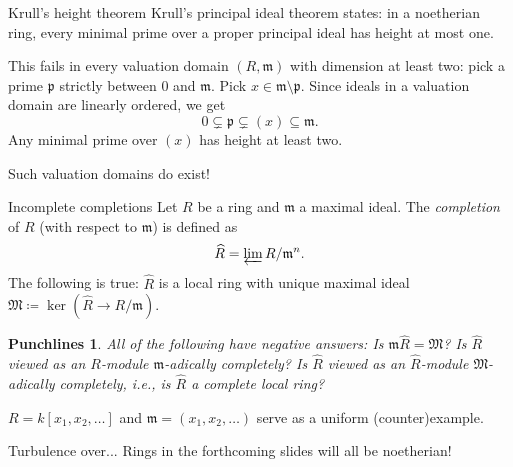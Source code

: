 \documentclass{beamer}
\newtheorem{punchlines}[theorem]{Punchlines}
\newcommand{\limit}{\varprojlim}
\begin{document}
	\begin{frame}{Krull's height theorem}
		Krull's principal ideal theorem states: in a noetherian ring, every minimal prime over a proper {\color{Red}principal} ideal \pause has height at most {\color{Red}one}. \pause

		This fails in every valuation domain $(R, \mathfrak{m})$ with dimension at least two: \pause pick a prime $\mathfrak{p}$ strictly between $0$ and $\mathfrak{m}$. \pause Pick $x \in \mathfrak{m} \setminus \mathfrak{p}$. \pause Since ideals in a valuation domain are linearly ordered, we get
		\begin{equation*} 
			0 \subsetneq \mathfrak{p} \subsetneq (x) \subseteq \mathfrak{m}.
		\end{equation*} \pause
		Any minimal prime over $(x)$ has height at least two. \pause

		{\tiny Such valuation domains do exist!}
	\end{frame}

	\begin{frame}{Incomplete completions}
		Let $R$ be a ring and $\mathfrak{m}$ a maximal ideal. \pause The \emph{completion} of $R$ (with respect to $\mathfrak{m}$) is defined as 
		\begin{equation*} 
			\widehat{R} = \limit R/\mathfrak{m}^{n}.
		\end{equation*} \pause
		The following is true: $\widehat{R}$ is a local ring with unique maximal ideal $\mathfrak{M} \coloneqq \ker(\widehat{R} \to R/\mathfrak{m})$. \pause

		\begin{punchlines}
			All of the following have negative answers: \pause \newline
			Is $\mathfrak{m} \widehat{R} = \mathfrak{M}$? \pause \newline
			Is $\widehat{R}$ viewed as an $R$-module $\mathfrak{m}$-adically completely? \pause \newline
			Is $\widehat{R}$ viewed as an $\widehat{R}$-module $\mathfrak{M}$-adically completely, i.e., is $\widehat{R}$ a complete local ring? 
		\end{punchlines} \pause
		$R = k[x_{1}, x_{2}, \ldots]$ and $\mathfrak{m} = (x_{1}, x_{2}, \ldots)$ serve as a uniform (counter)example. \hfill {\footnotesize \cite[\href{https://stacks.math.columbia.edu/tag/05JA}{Tag 05JA}]{stacks-project}}
	\end{frame}

	\begin{frame}{Turbulence over...}
		Rings in the forthcoming slides will all be noetherian!
	\end{frame}
\end{document}
